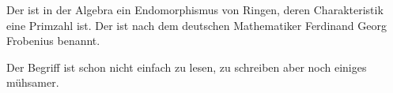 
Der \frob ist in der Algebra ein Endomorphismus von Ringen, deren Charakteristik eine Primzahl ist. Der \frob ist nach dem deutschen Mathematiker Ferdinand Georg Frobenius benannt.

\bigskip 
Der Begriff \frob ist schon nicht einfach zu lesen, zu schreiben aber noch einiges mühsamer. 

\bigskip
\bigskip 
